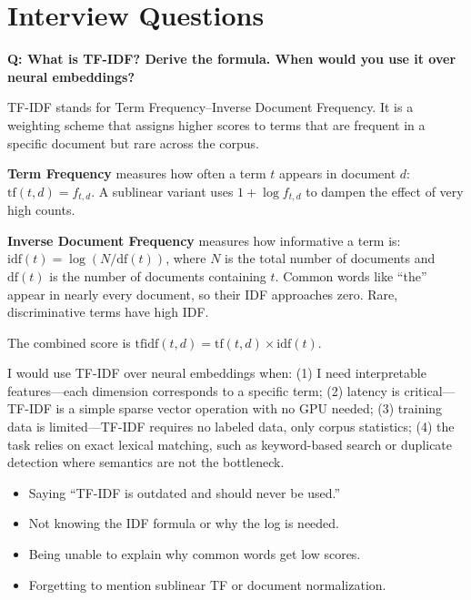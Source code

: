 \section{Interview Questions}
\label{sec:classical_interview}

\begin{interviewq}
\textbf{Q: What is TF-IDF? Derive the formula. When would you use it over neural embeddings?}

 \quad {} \quad \badgefreq{\freqhigh}

\stronganswer
TF-IDF stands for Term Frequency--Inverse Document Frequency. It is a weighting scheme that
assigns higher scores to terms that are frequent in a specific document but rare across the
corpus.

\textbf{Term Frequency} measures how often a term $t$ appears in document $d$:
$\text{tf}(t, d) = f_{t,d}$. A sublinear variant uses $1 + \log f_{t,d}$ to dampen the
effect of very high counts.

\textbf{Inverse Document Frequency} measures how informative a term is:
$\text{idf}(t) = \log(N / \text{df}(t))$, where $N$ is the total number of documents and
$\text{df}(t)$ is the number of documents containing $t$. Common words like ``the'' appear
in nearly every document, so their IDF approaches zero. Rare, discriminative terms have high
IDF.

The combined score is $\text{tfidf}(t, d) = \text{tf}(t, d) \times \text{idf}(t)$.

I would use TF-IDF over neural embeddings when: (1) I need interpretable features---each
dimension corresponds to a specific term; (2) latency is critical---TF-IDF is a simple
sparse vector operation with no GPU needed; (3) training data is limited---TF-IDF requires
no labeled data, only corpus statistics; (4) the task relies on exact lexical matching, such
as keyword-based search or duplicate detection where semantics are not the bottleneck.

\redflags
\begin{itemize}
    \item Saying ``TF-IDF is outdated and should never be used.''
    \item Not knowing the IDF formula or why the log is needed.
    \item Being unable to explain why common words get low scores.
    \item Forgetting to mention sublinear TF or document normalization.
\end{itemize}


\end{interviewq}
